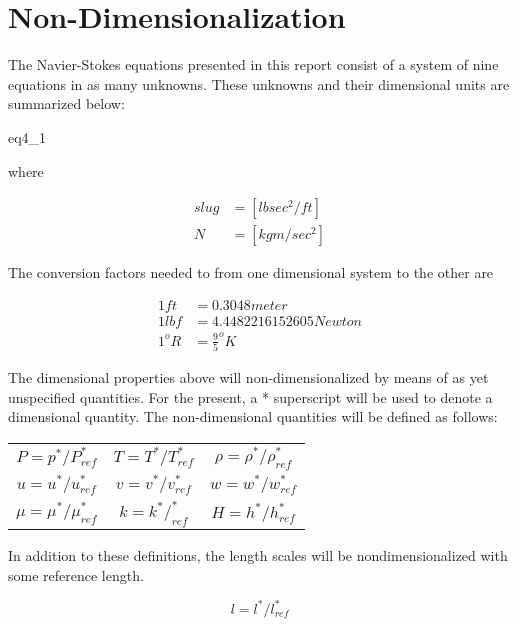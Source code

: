 \section{Non-Dimensionalization}

The Navier-Stokes equations presented in this report consist of a system of
nine equations in as many unknowns. These unknowns and their dimensional units
are summarized below:

{eq4_1}

where

\begin{equation}
\begin{aligned}
slug &= [lb sec^2/ft ] \\
N &= [kg m / sec^2 ]
\end{aligned}
\end{equation}

The conversion factors needed to from one dimensional system to the other are

\begin{equation}
\begin{aligned}
1 ft &= 0.3048 meter \\
1 lbf &= 4.4482216152605 Newton \\
1 ^o R &= \frac{9}{5} ^oK
\end{aligned}
\end{equation}

The dimensional properties above will non-dimensionalized by means of as yet
unspecified quantities. For the present, a * superscript will be used to denote
a dimensional quantity. The non-dimensional quantities will be defined as
follows:

\begin{center}
\begin{tabular}{ c c c }
$P = p^*/P^*_{ref}$ & $T = T^*/T^*_{ref}$ & $\rho = \rho^*/\rho^*_{ref}$ \\
$u = u^*/u^*_{ref}$ & $v = v^*/v^*_{ref}$ & $w = w^*/w^*_{ref}$ \\
$\mu = \mu^*/\mu^*_{ref}$ & $k = k^*/^*_{ref}$ & $H = h^*/h^*_{ref}$
\end{tabular}
\end{center}

In addition to these definitions, the length scales will be nondimensionalized
with some reference length.

\begin{equation}
l = l^*/l^*_{ref}
\end{equation}

